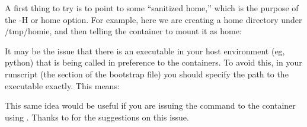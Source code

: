 \documentclass[letterpaper,10pt,english]{sphinxmanual}
\begin{document}
A first thing to try is to point to some “sanitized home,” which is
the purpose of the -H or \textendash{}home option. For example, here we are
creating a home directory under /tmp/homie, and then telling the
container to mount it as home:

%
\begin{sphinxVerbatim}[commandchars=\\\{\}]
        \PYGZbs{}

     
\end{sphinxVerbatim}

It may be the issue that there is an executable in your host
environment (eg, python) that is being called in preference to the
containers. To avoid this, in your runscript (the  section of the
bootstrap file) you should specify the path to the executable exactly.
This means:

%
\begin{sphinxVerbatim}[commandchars=\\\{\}]



  



  
\end{sphinxVerbatim}

This same idea would be useful if you are issuing the command to the
container using . Thanks to  for the suggestions on this
issue.
\end{document}
